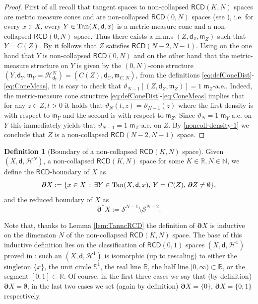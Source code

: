 \documentclass[a4paper]{amsart}
\theoremstyle{plain}
\theoremstyle{definition}
\newtheorem{definition}[lemma]{Definition}
\numberwithin{equation}{section}
\newcommand{\R}{\mathbb{R}}
\newcommand{\N}{\mathbb{N}}
\renewcommand{\S}{\mathcal{S}}
\newcommand{\RCD}{\mathsf{RCD}}
\newcommand{\mm}{\mathfrak m}
\newcommand{\sfd}{\mathsf d}
\newcommand{\cH}{\mathcal{H}}
\newcommand{\bRCD}{\boldsymbol\partial}
\begin{document}
{\begin{proof}
First of all recall that tangent  { spaces} to non-collapsed $\RCD(K,N)$ spaces are metric measure cones and are non-collapsed $\RCD(0,N)$ spaces (see \cite[Step 2, Page 645]{GDPNonColl}), i.e.  for every $x\in X$,  every  $Y\in {\rm Tan}(X,\sfd, x)$ is a  metric-measure cone and a non-collapsed $\RCD(0,N)$ space. Thus there exists a m.m.s $(Z,\sfd_{Z}, \mm_{Z})$ such that $Y=C(Z)$.  By \cite[Theorem 1.2]{Ket} it follows that $Z$ satisfies $\RCD(N-2,N-1)$. Using on the one hand that $Y$ is non-collapsed $\RCD(0,N)$ and on the other hand that the metric-measure structure on $Y$ is given by the $(0,N)$-cone structure $(Y, \sfd_{Y}, \mm_{Y}=\cH^{N}_{\sfd_{Y}})=(C(Z), \sfd_{C}, \mm_{C,N})$, from the definitions \eqref{eq:defConeDist}-\eqref{eq:ConeMeas},  it is easy to check that $\vartheta_{N-1}[(Z,\sfd_{Z},\mm_{Z})]=1$ $\mm_{Z}$-a.e..
 Indeed, the metric-measure cone structure  \eqref{eq:defConeDist}-\eqref{eq:ConeMeas}  implies that for any $z\in Z, t>0$ it holds that $\vartheta_N(t,z)=\vartheta_{N-1}(z)$ where the first density is with respect to $\mm_{Y}$ and the second is with respect to $\mm_{Z}$. Since $\vartheta_{N}=1$ $\mm_{Y}$-a.e. on $Y$ this immediately yields that $\vartheta_{N-1}=1$ $\mm_{Z}$-a.e. on $Z$.
By \eqref{noncoll-density-1} we conclude that  $Z$ is a non-collapsed $\RCD(N-2,N-1)$ space.
\end{proof}

\begin{definition}[Boundary of a non-collapsed $\RCD(K,N)$ space]\label{def:bRCD}
Given $(X,\sfd,\cH^{N})$, a non-collapsed $\RCD(K,N)$ space for some $K\in \R, N\in \N$, we define the {$\RCD$-}boundary of $X$ as
\begin{equation}\label{eq:defBoundary}
\bRCD X:=\{x\in X \,:\, \exists Y\in {\rm Tan}(X,\sfd,x), \, Y=C(Z), \, \bRCD Z\neq \emptyset\},
\end{equation}
and the reduced boundary of $X$ as
\begin{equation}\label{eq:defBoundary}
\bRCD^* X:= \S^{N-1}\setminus \S^{N-2}.
\end{equation}
\end{definition}

Note that, thanks to Lemma \ref{lem:TanncRCD} the definition of $\bRCD X$ is inductive on the dimension $N$ of the non-collapsed  $\RCD(K,N)$ space.
The base of this inductive definition lies on the classification of $\RCD(0,1)$ spaces $(X,\sfd, \cH^{1})$ proved in \cite{KL}: such an $(X,\sfd,\cH^{1} )$ is  isomorphic (up to rescaling) to either the singleton $\{x\}$, the unit circle ${\mathbb S}^{1}$, the real line $\R$, the half line $[0,\infty)\subset \R$, or the segment $[0,1]\subset \R$.  Of course, in the first three cases we say that (by definition) $\bRCD X=\emptyset$, in the last two cases we set (again by definition)  $\bRCD X=\{0\}$,  $\bRCD X=\{0,1\}$ respectively.
\\

}
\end{document}
